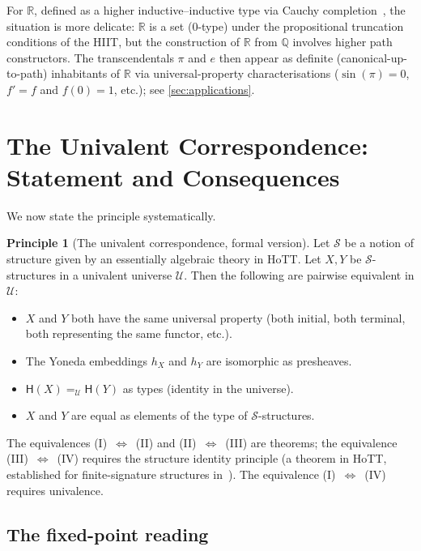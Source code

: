 \documentclass[12pt]{article}
\theoremstyle{definition}
\newtheorem{principle}[theorem]{Principle}
\theoremstyle{remark}
\newcommand{\Q}{\mathbb{Q}}
\newcommand{\R}{\mathbb{R}}
\newcommand{\U}{\mathcal{U}}
\begin{document}
For $\R$, defined as a higher inductive--inductive type via Cauchy
completion~\cite{Booij,HoTTBook}, the situation is more delicate: $\R$ is
a set ($0$-type) under the propositional truncation conditions of the
HIIT, but the construction of $\R$ from $\Q$ involves higher path
constructors. The transcendentals $\pi$ and $e$ then appear as definite
(canonical-up-to-path) inhabitants of $\R$ via universal-property
characterisations
($\sin(\pi) = 0$, $f' = f$ and $f(0) = 1$, etc.); see \cref{sec:applications}.

\section{The Univalent Correspondence: Statement and Consequences}
\label{sec:correspondence}

We now state the principle systematically.

\begin{principle}[The univalent correspondence, formal version]
\label{prin:formal}
Let $\mathcal{S}$ be a notion of structure given by an essentially
algebraic theory in HoTT. Let $X, Y$ be $\mathcal{S}$-structures in a
univalent universe $\U$. Then the following are pairwise equivalent in
$\U$:
\begin{itemize}
\item[\textsc{(I)}] $X$ and $Y$ both have the same universal property
(both initial, both terminal, both representing the same functor, etc.).
\item[\textsc{(II)}] The Yoneda embeddings $h_X$ and $h_Y$ are
isomorphic as presheaves.
\item[\textsc{(III)}] $\mathsf{H}(X) =_\U \mathsf{H}(Y)$ as types
(identity in the universe).
\item[\textsc{(IV)}] $X$ and $Y$ are equal as elements of the type of
$\mathcal{S}$-structures.
\end{itemize}
The equivalences \textsc{(I)}~$\Leftrightarrow$~\textsc{(II)} and
\textsc{(II)}~$\Leftrightarrow$~\textsc{(III)} are theorems; the
equivalence \textsc{(III)}~$\Leftrightarrow$~\textsc{(IV)} requires the
structure identity principle (a theorem in HoTT, established for
finite-signature structures in~\cite{HoTTBook,Escardo2019}). The
equivalence \textsc{(I)}~$\Leftrightarrow$~\textsc{(IV)} requires
univalence.
\end{principle}

\subsection{The fixed-point reading}
\end{document}
